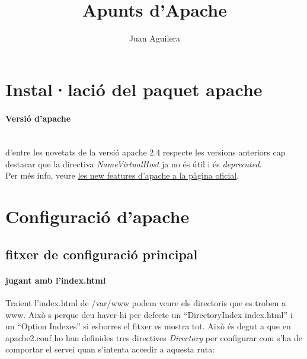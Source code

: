 \documentclass[a4paper, 11pt]{article}
\begin{document}
\title{Apunts d'Apache}
\author{Juan Aguilera}
\maketitle

\tableofcontents
\newpage

\section{Instal·laci\'o del paquet apache}
\paragraph{Versió d'apache \\}
 \\
d'entre les novetats de la versió apache 2.4 respecte les versions anteriors cap destacar que la directiva \textit{NameVirtualHost} ja no \'es útil i \'es \textit{deprecated}.\\
Per m\'es info, veure \href{https://httpd.apache.org/docs/2.4/new_features_2_4.html}{les new features d'apache a la pàgina oficial}\cite{DOC}.

\section{Configuració d'apache}
\subsection{fitxer de configuració principal}
\paragraph{jugant amb l'index.html }
Traient l'index.html de /var/www podem veure els directoris que es troben a www. Això s perque deu haver-hi per defecte un “DirectoryIndex index.html” i un “Option Indexes” si esborres el fitxer es mostra tot. Això \'es degut a que en apache2.conf ho han definides tres directives \textit{Directory} per configurar com s'ha de comportar el servei quan s'intenta accedir a aquesta ruta:
\end{document}
